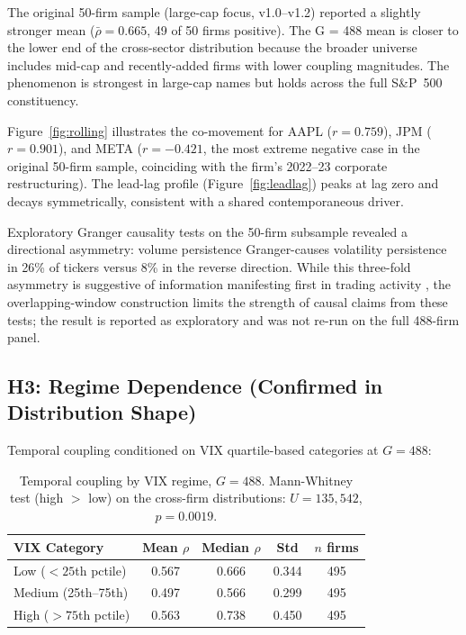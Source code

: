 \documentclass[preprint,12pt,authoryear]{elsarticle}
\begin{document}
The original 50-firm sample (large-cap focus, v1.0--v1.2) reported a slightly stronger mean ($\bar\rho = 0.665$, 49 of 50 firms positive). The G = 488 mean is closer to the lower end of the cross-sector distribution because the broader universe includes mid-cap and recently-added firms with lower coupling magnitudes. The phenomenon is strongest in large-cap names but holds across the full S\&P~500 constituency.

Figure~\ref{fig:rolling} illustrates the co-movement for AAPL ($r = 0.759$), JPM ($r = 0.901$), and META ($r = -0.421$, the most extreme negative case in the original 50-firm sample, coinciding with the firm's 2022--23 corporate restructuring). The lead-lag profile (Figure~\ref{fig:leadlag}) peaks at lag zero and decays symmetrically, consistent with a shared contemporaneous driver.

Exploratory Granger causality tests on the 50-firm subsample revealed a directional asymmetry: volume persistence Granger-causes volatility persistence in 26\% of tickers versus 8\% in the reverse direction. While this three-fold asymmetry is suggestive of information manifesting first in trading activity \citep{gallant1992stock, kyle1985continuous}, the overlapping-window construction limits the strength of causal claims from these tests; the result is reported as exploratory and was not re-run on the full 488-firm panel.

\subsection{H3: Regime Dependence (Confirmed in Distribution Shape)}

Temporal coupling conditioned on VIX quartile-based categories at $G = 488$:

\begin{table}[H]
\centering
\begin{tabular}{lcccc}
\toprule
VIX Category & Mean $\rho$ & Median $\rho$ & Std & $n$ firms \\
\midrule
Low ($< 25$th pctile) & 0.567 & 0.666 & 0.344 & 495 \\
Medium (25th--75th) & 0.497 & 0.566 & 0.299 & 495 \\
High ($> 75$th pctile) & 0.563 & 0.738 & 0.450 & 495 \\
\bottomrule
\end{tabular}
\caption{Temporal coupling by VIX regime, $G = 488$. Mann-Whitney test (high $>$ low) on the cross-firm distributions: $U = 135{,}542$, $p = 0.0019$.}
\label{tab:vix_regime}
\end{table}
\end{document}
